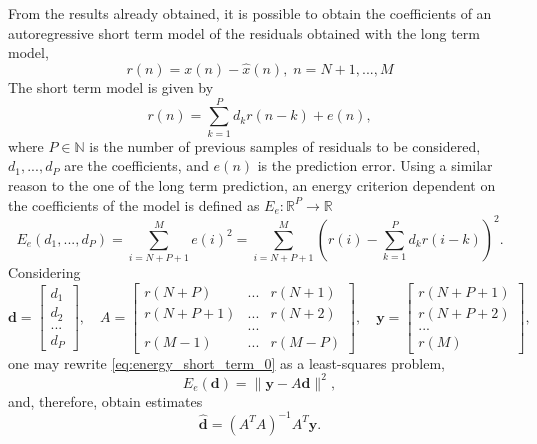 \documentclass[a4paper, oneside, 11pt]{article}
\begin{document}
From the results already obtained, it is possible to obtain the coefficients of an autoregressive short term model of the residuals obtained with the long term model,
\begin{equation*}
    r(n) = x(n) - \hat{x}(n), \; n = N+1,...,M
\end{equation*}
The short term model is given by
\begin{equation*}
    r(n) = \sum_{k=1}^P d_k r(n-k) + e(n),
\end{equation*}
where $P\in \mathbb{N}$ is the number of previous samples of residuals to be considered, $d_1, ..., d_P$ are the coefficients, and $e(n)$ is the prediction error. Using a similar reason to the one of the long term prediction, an energy criterion dependent on the coefficients of the model is defined as $E_e: \mathbb{R}^P \rightarrow \mathbb{R}$
\begin{equation} \label{eq:energy_short_term_0}
    E_e(d_1,...,d_P) = \sum_{i=N+P+1}^M e(i)^2 = \sum_{i=N+P+1}^M \left (r(i) - \sum_{k=1}^P d_k r(i-k) \right)^2.
\end{equation}
Considering
\begin{equation*}
    \mathbf{d} = \begin{bmatrix} d_1 \\ d_2 \\ ... \\ d_P \end{bmatrix}, \quad A = \begin{bmatrix} r(N+P) & ... & r(N+1) \\
    r(N+P+1) & ... & r(N+2) \\
    & ... & \\
    r(M-1) & ... & r(M-P) \end{bmatrix}, \quad \mathbf{y} = \begin{bmatrix} r(N+P+1) \\ r(N+P+2) \\ ... \\ r(M) \end{bmatrix},
\end{equation*}
one may rewrite \eqref{eq:energy_short_term_0} as a least-squares problem,
\begin{equation} \label{eq:energy_short_term}
    E_e(\mathbf{d}) = \| \mathbf{y} - A \mathbf{d} \|^2,
\end{equation}
and, therefore, obtain estimates
\begin{equation} \label{eq:short_term_est}
    \hat{\mathbf{d}} = (A^T A)^{-1} A^T \mathbf{y}.
\end{equation}
\end{document}
